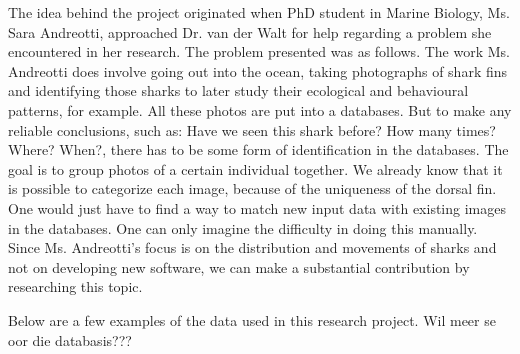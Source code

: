 \documentclass[a4paper,10pt]{article}
\begin{document}
The idea behind the project originated when PhD
student in Marine Biology, Ms. Sara Andreotti, approached Dr. van der Walt for
help regarding a problem she encountered in her research.
The problem presented was
as follows.  The work Ms. Andreotti does involve going out into the ocean,
taking photographs of shark fins and identifying those sharks to later study their ecological and behavioural
patterns, for example.
All these photos are put into a databases. But to
make any reliable conclusions, such as: Have we seen this shark before?  How
many
times? Where? When?, there has to be some form of identification in the
databases. 
The goal is to group photos of a certain individual together.  We
already know that it is possible to categorize each image, because of the
uniqueness of the dorsal fin.  One would just have to find a way to match new
input data with existing images in the databases.  One can only imagine the
difficulty in doing this manually. 
Since Ms. Andreotti's
focus is on the distribution and movements of sharks and not on developing new
software, we can make a substantial contribution by researching this topic. 

Below are a few examples of the data used in this research project.  Wil meer se oor die databasis???

\begin{figure}[H]
\centering
\mbox{ \quad
{} \quad
{}}
\end{figure}
\end{document}
